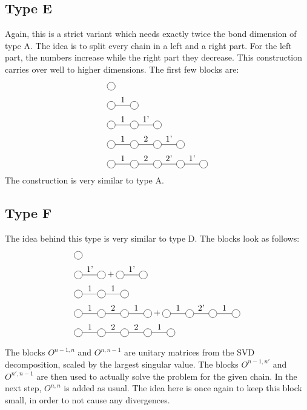 \subsection{Type E}

Again, this is a strict variant which needs exactly twice the bond dimension of type A. The idea is to split every chain in a left and a right part. For the left part, the numbers increase while the right part they decrease. This construction carries over well to higher dimensions. The first few blocks are:
\begin{equation}
    \begin{split}
        &\mpob{1}{ {,}  }{}{}{}{{,,}} \\
        &\mpob{2}{ {,"1",}  }{}{}{}{{,,}}\\
        &\mpob{3}{ {,"1","1'",}  }{}{}{}{{,,,}}\\
        &\mpob{4}{ {,"1","2","1'",}  }{}{}{}{{,,,,,}}\\
        &\mpob{5}{ {,"1","2","2'","1'",}  }{}{}{}{{,,,,,}}\\
    \end{split}
\end{equation}
The construction is very similar to type A.

\subsection{Type F}

The idea behind this type is very similar to type D. The blocks look as follows:
\begin{equation}
    \begin{split}
        &\mpob{1}{ {,}  }{}{}{}{{,,}} \\
        &\mpob{2}{ {,"1'",}  }{}{}{}{{,,}}+\mpob{2}{ {,"1'",}  }{}{}{}{{,,}}\\
        &\mpob{3}{ {,"1","1",}  }{}{}{}{{,,,}}\\
        &\mpob{4}{ {,"1","2","1",}  }{}{}{}{{,,,,,}}+\mpob{4}{ {,"1","2'","1",}  }{}{}{}{{,,,,,}}\\
        &\mpob{5}{ {,"1","2","2","1",}  }{}{}{}{{,,,,,}}\\
    \end{split}
\end{equation}

The  blocks $O^{n-1,n}$ and $O^{n,n-1}$ are unitary matrices from the SVD decomposition, scaled by the largest singular value. The blocks $O^{n-1,n'}$ and $O^{n',n-1}$ are then used to actually solve the problem for the given chain. In the next step, $O^{n,n}$ is added as usual. The idea here is once again to keep this block small, in order to not cause any divergences.

